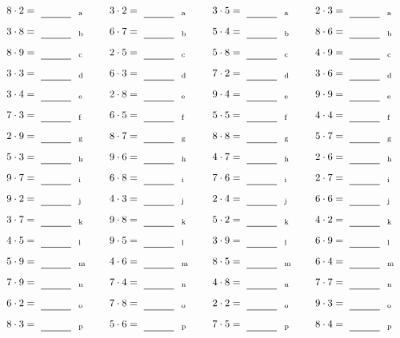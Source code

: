 \documentclass
[
  draft    = true,
  fontsize = 11pt,
  parskip  = half-
]
{scrartcl}
\begin{document}
\par\vfill\par
\begin{align*}
    \pline{8\cdot2}&=\rline{a}
  & \pline{3\cdot2}&=\rline{a}
  & \pline{3\cdot5}&=\rline{a}
  & \pline{2\cdot3}&=\rline{a} \\[1ex]
    \pline{3\cdot8}&=\rline{b}
  & \pline{6\cdot7}&=\rline{b}
  & \pline{5\cdot4}&=\rline{b}
  & \pline{8\cdot6}&=\rline{b} \\[1ex]
    \pline{8\cdot9}&=\rline{c}
  & \pline{2\cdot5}&=\rline{c}
  & \pline{5\cdot8}&=\rline{c}
  & \pline{4\cdot9}&=\rline{c} \\[1ex]
    \pline{3\cdot3}&=\rline{d}
  & \pline{6\cdot3}&=\rline{d}
  & \pline{7\cdot2}&=\rline{d}
  & \pline{3\cdot6}&=\rline{d} \\[1ex]
    \pline{3\cdot4}&=\rline{e}
  & \pline{2\cdot8}&=\rline{e}
  & \pline{9\cdot4}&=\rline{e}
  & \pline{9\cdot9}&=\rline{e} \\[1ex]
    \pline{7\cdot3}&=\rline{f}
  & \pline{6\cdot5}&=\rline{f}
  & \pline{5\cdot5}&=\rline{f}
  & \pline{4\cdot4}&=\rline{f} \\[1ex]
    \pline{2\cdot9}&=\rline{g}
  & \pline{8\cdot7}&=\rline{g}
  & \pline{8\cdot8}&=\rline{g}
  & \pline{5\cdot7}&=\rline{g} \\[1ex]
    \pline{5\cdot3}&=\rline{h}
  & \pline{9\cdot6}&=\rline{h}
  & \pline{4\cdot7}&=\rline{h}
  & \pline{2\cdot6}&=\rline{h} \\[1ex]
    \pline{9\cdot7}&=\rline{i}
  & \pline{6\cdot8}&=\rline{i}
  & \pline{7\cdot6}&=\rline{i}
  & \pline{2\cdot7}&=\rline{i} \\[1ex]
    \pline{9\cdot2}&=\rline{j}
  & \pline{4\cdot3}&=\rline{j}
  & \pline{2\cdot4}&=\rline{j}
  & \pline{6\cdot6}&=\rline{j} \\[1ex]
    \pline{3\cdot7}&=\rline{k}
  & \pline{9\cdot8}&=\rline{k}
  & \pline{5\cdot2}&=\rline{k}
  & \pline{4\cdot2}&=\rline{k} \\[1ex]
    \pline{4\cdot5}&=\rline{l}
  & \pline{9\cdot5}&=\rline{l}
  & \pline{3\cdot9}&=\rline{l}
  & \pline{6\cdot9}&=\rline{l} \\[1ex]
    \pline{5\cdot9}&=\rline{m}
  & \pline{4\cdot6}&=\rline{m}
  & \pline{8\cdot5}&=\rline{m}
  & \pline{6\cdot4}&=\rline{m} \\[1ex]
    \pline{7\cdot9}&=\rline{n}
  & \pline{7\cdot4}&=\rline{n}
  & \pline{4\cdot8}&=\rline{n}
  & \pline{7\cdot7}&=\rline{n} \\[1ex]
    \pline{6\cdot2}&=\rline{o}
  & \pline{7\cdot8}&=\rline{o}
  & \pline{2\cdot2}&=\rline{o}
  & \pline{9\cdot3}&=\rline{o} \\[1ex]
    \pline{8\cdot3}&=\rline{p}
  & \pline{5\cdot6}&=\rline{p}
  & \pline{7\cdot5}&=\rline{p}
  & \pline{8\cdot4}&=\rline{p}
\end{align*}
\end{document}
